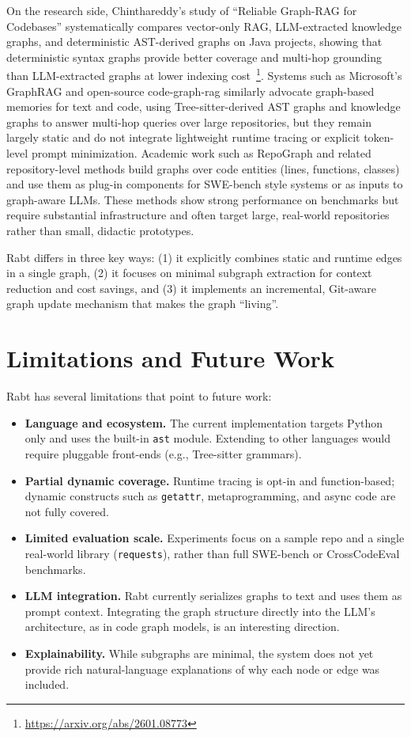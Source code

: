\documentclass[11pt]{article}
\begin{document}
On the research side, Chinthareddy's study of ``Reliable Graph-RAG for Codebases'' systematically compares vector-only RAG, LLM-extracted knowledge graphs, and deterministic AST-derived graphs on Java projects, showing that deterministic syntax graphs provide better coverage and multi-hop grounding than LLM-extracted graphs at lower indexing cost~\footnote{\url{https://arxiv.org/abs/2601.08773}}.
Systems such as Microsoft's GraphRAG and open-source code-graph-rag similarly advocate graph-based memories for text and code, using Tree-sitter-derived AST graphs and knowledge graphs to answer multi-hop queries over large repositories, but they remain largely static and do not integrate lightweight runtime tracing or explicit token-level prompt minimization.
Academic work such as RepoGraph and related repository-level methods build graphs over code entities (lines, functions, classes) and use them as plug-in components for SWE-bench style systems or as inputs to graph-aware LLMs.
These methods show strong performance on benchmarks but require substantial infrastructure and often target large, real-world repositories rather than small, didactic prototypes.

Rabt differs in three key ways:
(1) it explicitly combines static and runtime edges in a single graph,
(2) it focuses on minimal subgraph extraction for context reduction and cost savings, and
(3) it implements an incremental, Git-aware graph update mechanism that makes the graph ``living''.



\section{Limitations and Future Work}

Rabt has several limitations that point to future work:
\begin{itemize}
  \item \textbf{Language and ecosystem.} The current implementation targets Python only and uses the built-in \texttt{ast} module.
  Extending to other languages would require pluggable front-ends (e.g., Tree-sitter grammars).
  \item \textbf{Partial dynamic coverage.} Runtime tracing is opt-in and function-based; dynamic constructs such as \texttt{getattr}, metaprogramming, and async code are not fully covered.
  \item \textbf{Limited evaluation scale.} Experiments focus on a sample repo and a single real-world library (\texttt{requests}), rather than full SWE-bench or CrossCodeEval benchmarks.
  \item \textbf{LLM integration.} Rabt currently serializes graphs to text and uses them as prompt context.
  Integrating the graph structure directly into the LLM's architecture, as in code graph models, is an interesting direction.
  \item \textbf{Explainability.} While subgraphs are minimal, the system does not yet provide rich natural-language explanations of why each node or edge was included.
\end{itemize}
\end{document}
